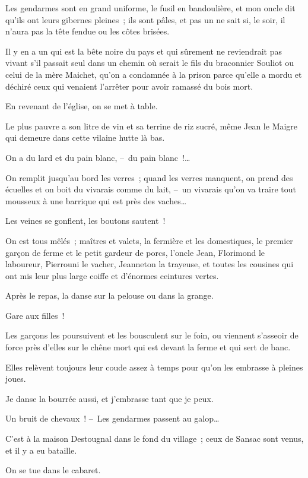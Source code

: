 \documentclass[french,twoside]{book} %
\begin{document}
Les gendarmes sont en grand uniforme, le fusil en bandoulière, et mon oncle dit qu’ils ont leurs gibernes pleines ; ils sont pâles, et pas un ne sait si, le soir, il n’aura pas la tête fendue ou les côtes brisées.\par
Il y en a un qui est la bête noire du pays et qui sûrement ne reviendrait pas vivant s’il passait seul dans un chemin où serait le fils du braconnier Souliot ou celui de la mère Maichet, qu’on a condamnée à la prison parce qu’elle a mordu et déchiré ceux qui venaient l’arrêter pour avoir ramassé du bois mort.\par
En revenant de l’église, on se met à table.\par
Le plus pauvre a son litre de vin et sa terrine de riz sucré, même Jean le Maigre qui demeure dans cette vilaine hutte là bas.\par
On a du lard et du pain blanc, – du pain blanc !…\par
On remplit jusqu’au bord les verres ; quand les verres manquent, on prend des écuelles et on boit du vivarais comme du lait, – un vivarais qu’on va traire tout mousseux à une barrique qui est près des vaches…\par
Les veines se gonflent, les boutons sautent !\par
On est tous mêlés ; maîtres et valets, la fermière et les domestiques, le premier garçon de ferme et le petit gardeur de porcs, l’oncle Jean, Florimond le laboureur, Pierrouni le vacher, Jeanneton la trayeuse, et toutes les cousines qui ont mis leur plus large coiffe et d’énormes ceintures vertes.\par
Après le repas, la danse sur la pelouse ou dans la grange.\par
Gare aux filles !\par
Les garçons les poursuivent et les bousculent sur le foin, ou viennent s’asseoir de force près d’elles sur le chêne mort qui est devant la ferme et qui sert de banc.\par
Elles relèvent toujours leur coude assez à temps pour qu’on les embrasse à pleines joues.\par
Je danse la bourrée aussi, et j’embrasse tant que je peux.\par
\bigbreak
\noindent Un bruit de chevaux ! – Les gendarmes passent au galop…\par
C’est à la maison Destougnal dans le fond du village ; ceux de Sansac sont venus, et il y a eu bataille.\par
On se tue dans le cabaret.\par
\end{document}

